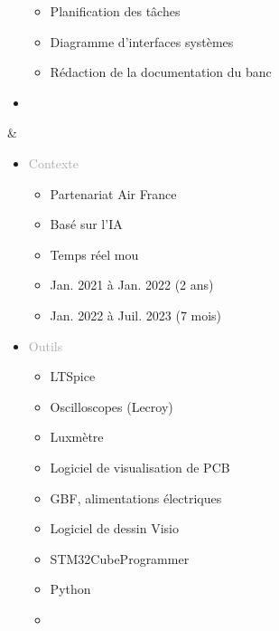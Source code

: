 \documentclass{article}
\begin{document}
\begin{tabular}
\begin{itemize}
\begin{itemize}
            \item \textcolor{gray!80}{Planification des tâches}
            \item \textcolor{gray!80}{Diagramme d'interfaces systèmes}
            \item \textcolor{gray!80}{Rédaction de la documentation du banc}  
        \end{itemize}
        \item \textcolor{darkGray}{}
    \end{itemize}
    &
    \begin{itemize}[label={}, topsep=0pt, partopsep=0pt, itemsep=0.5pt, parsep=2pt]
        \setlength{\itemsep}{0pt} 
        \item \textcolor{darkGray}{Contexte}
        \begin{itemize}
        [label={\textcolor{gray!80}{\checkmark}}, topsep=0pt, partopsep=0pt, itemsep=0.5pt, parsep=2pt] 
            \item \textcolor{gray!80}{Partenariat Air France}
            \item \textcolor{gray!80}{Basé sur l'IA}
            \item \textcolor{gray!80}{Temps réel mou}
            \item \textcolor{gray!80}{Jan. 2021 à Jan. 2022 (2 ans)}
            \item \textcolor{gray!80}{Jan. 2022 à Juil. 2023 (7 mois)}
        \end{itemize}
        \item \textcolor{darkGray}{Outils}
        \begin{itemize}
        [label={\textcolor{gray!80}{\checkmark}}, topsep=0pt, partopsep=0pt, itemsep=0.5pt, parsep=2pt] 
            \item \textcolor{gray!80}{LTSpice}
            \item \textcolor{gray!80}{Oscilloscopes (Lecroy)}
            \item \textcolor{gray!80}{Luxmètre}
            \item \textcolor{gray!80}{Logiciel de visualisation de PCB}
            \item \textcolor{gray!80}{GBF, alimentations électriques}
            \item \textcolor{gray!80}{Logiciel de dessin Visio}
            \item \textcolor{gray!80}{STM32CubeProgrammer}
            \item \textcolor{gray!80}{Python}
            \item[\textcolor{white}{\checkmark}] \textcolor{gray!80}{} %

\end{itemize}
\end{itemize}
\end{tabular}
\end{document}
